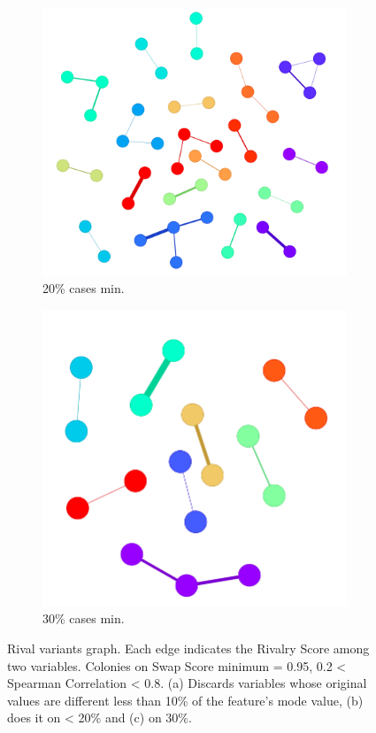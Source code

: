 \begin{figure}[!h]
\begin{subfigure}[b]{0.30\linewidth}
		\includegraphics[width=\linewidth]{Minor Thesis/figures/graphs/main/g95202028.png}
		\caption{20\% cases min.}
	\end{subfigure}
	\hfill
	\begin{subfigure}[b]{0.30\linewidth}
		\includegraphics[width=\linewidth]{Minor Thesis/figures/graphs/main/g95302028.png}
		\caption{30\% cases min.}
	\end{subfigure}
	\hfill
    \caption{Rival variants graph. Each edge indicates the Rivalry Score among two variables. Colonies on Swap Score minimum = 0.95, 0.2 < Spearman Correlation < 0.8. (a) Discards variables whose original values are different less than 10\% of the feature's mode value, (b) does it on < 20\% and (c) on 30\%.}
    \label{fig:main-graphs}
\end{figure}


